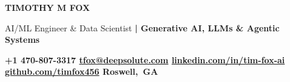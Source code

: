 \documentclass[10pt,letterpaper]{article}
\begin{document}
{\color{black}\fontsize{30}{34}\selectfont\bfseries TIMOTHY M FOX}\par
\vspace{4pt}
{\color{accent}\fontsize{14}{16}\selectfont
  AI/ML Engineer \& Data Scientist \textbf{| Generative AI, LLMs \& Agentic Systems}}\par
\vspace{6pt}
{\small\bfseries\color{meta}%
  {\color{accent}\faPhone*}\hspace{4pt}+1 470-807-3317\hspace{8pt}
  {\color{accent}\faAt}\hspace{4pt}\href{mailto:tfox@deepsolute.com}{tfox@deepsolute.com}\hspace{8pt}
  {\color{accent}\faLink}\hspace{4pt}\href{https://www.linkedin.com/in/tim-fox-ai}{linkedin.com/in/tim-fox-ai}\hspace{8pt}
  {\color{accent}\faGithub}\hspace{4pt}\href{https://github.com/timfox456}{github.com/timfox456}\hspace{8pt}
  \mbox{{\color{accent}\faMapMarker*}\hspace{4pt}Roswell, GA}}\par
\vspace{2pt}
\end{document}
